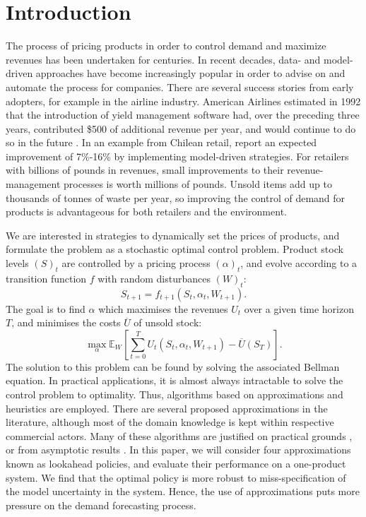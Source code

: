 \documentclass[main.tex]{subfiles}
\begin{document}
\listoftodos

\section{Introduction}
The process of pricing products in order to control demand and
maximize revenues has been undertaken for centuries. In recent
decades, data- and model-driven approaches have become increasingly
popular in order to advise on and automate the process for companies.
There are several success stories from early adopters, for example in
the airline industry. American Airlines estimated in 1992 that
the introduction of yield management software had, over the preceding
three years, contributed \$500 of additional revenue per year,
and would continue to do so in the future \citep{smith1992yield}.
In an example from Chilean retail, \citet{bitran1998coordinating}
report an expected improvement of 7\%-16\% by implementing
model-driven strategies.
For retailers with billions of pounds in revenues, small
improvements to their revenue-management processes is worth millions
of pounds.
Unsold items add up to thousands of tonnes of waste per year, so
improving the control of demand for products is advantageous
for both retailers and the environment.

We are interested in strategies to dynamically set the prices of products, and
formulate the problem as a stochastic optimal control problem.
Product stock levels ${(S)}_t$ are controlled by a pricing process
${(\alpha)}_t$, and evolve according to a transition function $f$ with random disturbances
${(W)}_t$:
\begin{equation}
  S_{t+1}=f_{t+1}(S_t,\alpha_t,W_{t+1}).
\end{equation}
The goal is to find $\alpha$ which maximises the revenues $U_t$ over a
given time horizon $T$, and
minimises the costs $\overline{U}$ of unsold stock:
\begin{equation}
  \max_{\alpha}\mathbb E_W\left[ \sum_{t=0}^TU_t(S_t,\alpha_t,W_{t+1})
    - \overline{U}(S_T)\right].
\end{equation}
The solution to this problem can be found by solving the associated
Bellman equation. In practical applications, it is almost always
intractable to solve the control problem to optimality.
Thus, algorithms based on approximations and heuristics are employed.
There are several proposed approximations in the
literature, although most of the domain knowledge is kept within
respective commercial actors.
Many of these algorithms are justified on practical grounds
\citep{aviv2012dynamic}, or
from asymptotic results \citep{gallego1994optimal}.
In this paper, we will consider four approximations known as
lookahead policies,
and evaluate their performance on a one-product system.
We find that the optimal policy is more robust to
miss-specification of the model uncertainty in the system.
Hence, the use of approximations puts more pressure on the
demand forecasting process.
\end{document}
